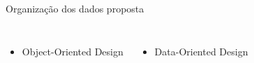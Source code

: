 \begin{frame}{Organização dos dados proposta}
    \begin{columns}
            \begin{itemize}
                \item Object-Oriented Design
            \end{itemize}
            \begin{itemize}
                \item Data-Oriented Design
            \end{itemize}
    \end{columns}
\end{frame}




